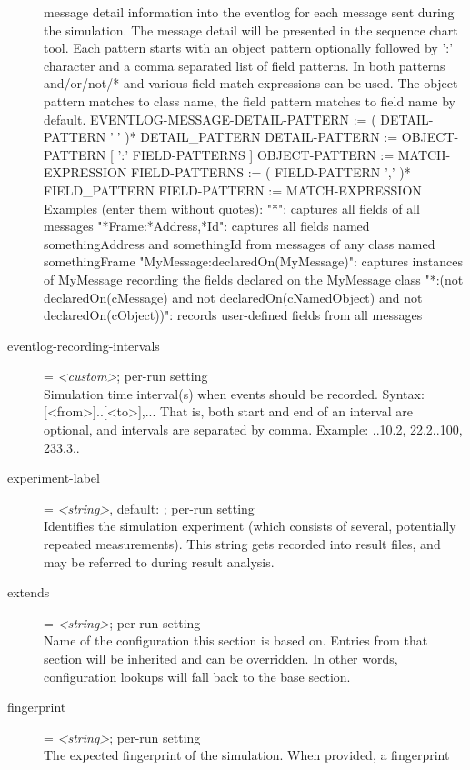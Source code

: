 \begin{description}
    message detail information into the eventlog for each message sent during
    the simulation. The message detail will be presented in the sequence chart
    tool. Each pattern starts with an object pattern optionally followed by ':'
    character and a comma separated list of field patterns. In both patterns
    and/or/not/* and various field match expressions can be used. The object
    pattern matches to class name, the field pattern matches to field name by
    default.
      EVENTLOG-MESSAGE-DETAIL-PATTERN := ( DETAIL-PATTERN '|' )*
    DETAIL\_PATTERN
      DETAIL-PATTERN := OBJECT-PATTERN [ ':' FIELD-PATTERNS ]
      OBJECT-PATTERN := MATCH-EXPRESSION
      FIELD-PATTERNS := ( FIELD-PATTERN ',' )* FIELD\_PATTERN
      FIELD-PATTERN := MATCH-EXPRESSION
    Examples (enter them without quotes):
      "*": captures all fields of all messages
      "*Frame:*Address,*Id": captures all fields named somethingAddress and
    somethingId from messages of any class named somethingFrame
      "MyMessage:declaredOn(MyMessage)": captures instances of MyMessage
    recording the fields declared on the MyMessage class
      "*:(not declaredOn(cMessage) and not declaredOn(cNamedObject) and not
    declaredOn(cObject))": records user-defined fields from all messages
\item[eventlog-recording-intervals] = \textit{<custom>}; per-run setting \\
    Simulation time interval(s) when events should be recorded. Syntax:
    [<from>]..[<to>],... That is, both start and end of an interval are
    optional, and intervals are separated by comma. Example: ..10.2, 22.2..100,
    233.3..
\item[experiment-label] = \textit{<string>}, default: ; per-run setting \\
    Identifies the simulation experiment (which consists of several,
    potentially repeated measurements). This string gets recorded into result
    files, and may be referred to during result analysis.
\item[extends] = \textit{<string>}; per-run setting \\
    Name of the configuration this section is based on. Entries from that
    section will be inherited and can be overridden. In other words,
    configuration lookups will fall back to the base section.
\item[fingerprint] = \textit{<string>}; per-run setting \\
    The expected fingerprint of the simulation. When provided, a fingerprint

\end{description}
